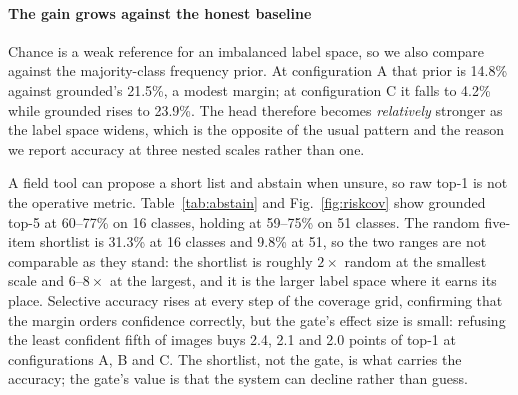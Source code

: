 \documentclass[a4paper,fleqn]{cas-dc}
\begin{document}
\paragraph{The gain grows against the honest baseline} Chance is a weak reference for an imbalanced
label space, so we also compare against the majority-class frequency prior. At configuration A that
prior is 14.8\% against grounded's 21.5\%, a modest margin; at configuration C it falls to 4.2\%
while grounded rises to 23.9\%. The head therefore becomes \emph{relatively} stronger as the label
space widens, which is the opposite of the usual pattern and the reason we report accuracy at three
nested scales rather than one.

A field tool can propose a short list and abstain when unsure, so raw top-1 is not the operative
metric. %
Table~\ref{tab:abstain} and Fig.~\ref{fig:riskcov} show grounded top-5 at 60--77\% on 16 classes,
holding at 59--75\% on 51 classes. The random five-item shortlist is 31.3\% at 16 classes and
9.8\% at 51, so the two ranges are not comparable as they stand: the shortlist is roughly
$2\times$ random at the smallest scale and $6$--$8\times$ at the largest, and it is the larger
label space where it earns its place. Selective accuracy rises at every step of the coverage grid,
confirming that the margin orders confidence correctly, but the gate's effect size is small:
refusing the least confident fifth of images buys 2.4, 2.1 and 2.0 points of top-1 at
configurations A, B and C.
The shortlist, not the gate, is what carries the accuracy; the gate's value is that
the system can decline rather than guess.
\end{document}
